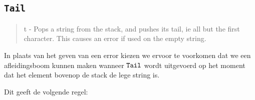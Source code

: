 \subsection{\texttt{Tail}}
\label{sec:rules:tail}

\begin{quote}
    t - Pops a string from the stack, and pushes its tail, ie all but the first character. This causes an error if used on the empty string.
\end{quote}

In plaats van het geven van een error kiezen we ervoor te voorkomen dat we een
afleidingsboom kunnen maken wanneer $\texttt{Tail}$ wordt uitgevoerd op het moment
dat het element bovenop de stack de lege string is.

Dit geeft de volgende regel:
\thertailns%
